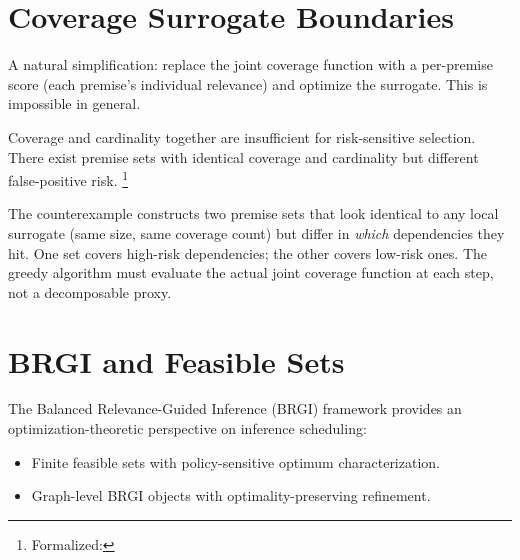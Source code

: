 \documentclass[11pt,openany]{report}
\begin{document}


\section{Coverage Surrogate Boundaries}
\label{sec:surrogate-nogo}

A natural simplification: replace the joint coverage function with
a per-premise score (each premise's individual relevance) and optimize
the surrogate.  This is impossible in general.

\boundarystart
\begin{theorem}
\label{thm:surrogate-no-go}
Coverage and cardinality together are insufficient for risk-sensitive
selection.  There exist premise sets with identical coverage and
cardinality but different false-positive risk.%
\footnote{Formalized:
}
\end{theorem}
\boundaryend

\noindent
The counterexample constructs two premise sets that look identical to
any local surrogate (same size, same coverage count) but differ in
\emph{which} dependencies they hit.  One set covers high-risk
dependencies; the other covers low-risk ones.  The greedy algorithm
must evaluate the actual joint coverage function at each step, not a
decomposable proxy.


\section{BRGI and Feasible Sets}

The Balanced Relevance-Guided Inference (BRGI) framework provides an
optimization-theoretic perspective on inference scheduling:
\begin{itemize}
\item Finite feasible sets with policy-sensitive optimum
  characterization.
\item Graph-level BRGI objects with optimality-preserving refinement.
\end{itemize}
\end{document}
